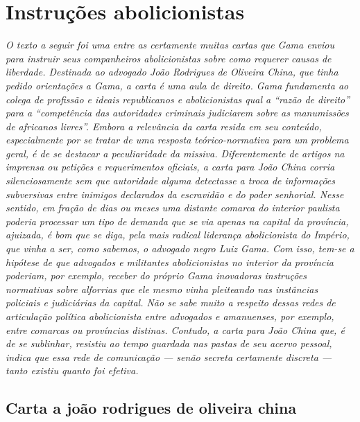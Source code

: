\part{Instruções abolicionistas}

\begin{argumento}
\emph{O texto a seguir foi uma entre as certamente muitas cartas que
Gama enviou para instruir seus companheiros abolicionistas sobre como
requerer causas de liberdade. Destinada ao advogado João Rodrigues de
Oliveira China, que tinha pedido orientações a Gama, a carta é uma aula
de direito. Gama fundamenta ao colega de profissão e ideais republicanos
e abolicionistas qual a ``razão de direito'' para a ``competência das
autoridades criminais judiciarem sobre as manumissões de africanos
livres''. Embora a relevância da carta resida em seu conteúdo,
especialmente por se tratar de uma resposta teórico-normativa para um
problema geral, é de se destacar a peculiaridade da missiva.
Diferentemente de artigos na imprensa ou petições e requerimentos
oficiais, a carta para João China corria silenciosamente sem que
autoridade alguma detectasse a troca de informações subversivas entre
inimigos declarados da escravidão e do poder senhorial. Nesse sentido,
em fração de dias ou meses uma distante comarca do interior paulista
poderia processar um tipo de demanda que se via apenas na capital da
província, ajuizada, é bom que se diga, pela mais radical liderança
abolicionista do Império, que vinha a ser, como sabemos, o advogado
negro Luiz Gama. Com isso, tem-se a hipótese de que advogados e
militantes abolicionistas no interior da província poderiam, por
exemplo, receber do próprio Gama inovadoras instruções normativas sobre
alforrias que ele mesmo vinha pleiteando nas instâncias policiais e
judiciárias da capital. Não se sabe muito a respeito dessas redes de
articulação política abolicionista entre advogados e amanuenses, por
exemplo, entre comarcas ou províncias distinas. Contudo, a carta para
João China que, é de se sublinhar, resistiu ao tempo guardada nas pastas
de seu acervo pessoal, indica que essa rede de comunicação --- senão
secreta certamente discreta --- tanto existiu quanto foi efetiva.}
\end{argumento}

\chapter{Carta a joão rodrigues de oliveira china}%

